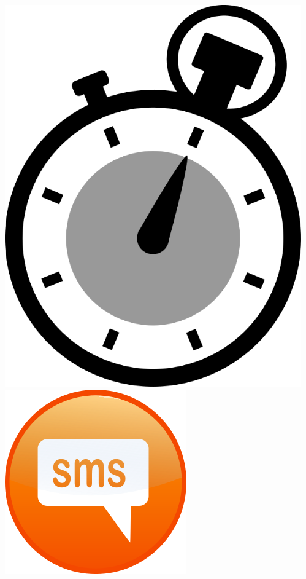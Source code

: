 \documentclass[pdflatex,compress]{beamer}
\begin{document}
\begin{frame}
\begin{columns}[onlytextwidth]
\begin{column}{0.4\textwidth}
      \includegraphics[scale=.125]{alarm.png}\\
      \vspace{.2cm}
      \includegraphics[scale=1]{sms.png}
    \end{column}
​    \end{columns}
\end{frame}
\end{document}
